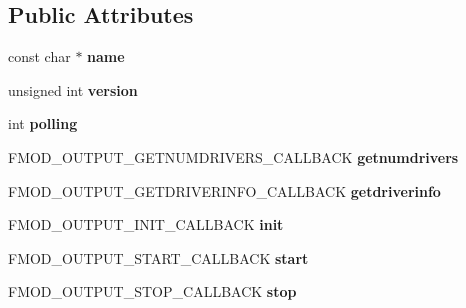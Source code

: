 \subsection*{Public Attributes}
\begin{DoxyCompactItemize}
\item 
\mbox{\label{structFMOD__OUTPUT__DESCRIPTION_a485fd85448a97e6762c535ec8b88f22a}} 
const char $\ast$ {\bfseries name}
\item 
\mbox{\label{structFMOD__OUTPUT__DESCRIPTION_a1ffa1ceb39e6b22a0887819f479cbdd9}} 
unsigned int {\bfseries version}
\item 
\mbox{\label{structFMOD__OUTPUT__DESCRIPTION_a523fa9268311d2f39464bc0d8bdacf53}} 
int {\bfseries polling}
\item 
\mbox{\label{structFMOD__OUTPUT__DESCRIPTION_a65a9a7d1b963ff0bf16fe0937bb50f69}} 
F\+M\+O\+D\+\_\+\+O\+U\+T\+P\+U\+T\+\_\+\+G\+E\+T\+N\+U\+M\+D\+R\+I\+V\+E\+R\+S\+\_\+\+C\+A\+L\+L\+B\+A\+CK {\bfseries getnumdrivers}
\item 
\mbox{\label{structFMOD__OUTPUT__DESCRIPTION_a83a93f62be3425e54992623c32a15417}} 
F\+M\+O\+D\+\_\+\+O\+U\+T\+P\+U\+T\+\_\+\+G\+E\+T\+D\+R\+I\+V\+E\+R\+I\+N\+F\+O\+\_\+\+C\+A\+L\+L\+B\+A\+CK {\bfseries getdriverinfo}
\item 
\mbox{\label{structFMOD__OUTPUT__DESCRIPTION_a985b9b14d82739abeee0eec8e0ae8a11}} 
F\+M\+O\+D\+\_\+\+O\+U\+T\+P\+U\+T\+\_\+\+I\+N\+I\+T\+\_\+\+C\+A\+L\+L\+B\+A\+CK {\bfseries init}
\item 
\mbox{\label{structFMOD__OUTPUT__DESCRIPTION_a3898df713781eba4e5dc7ca213cf5d52}} 
F\+M\+O\+D\+\_\+\+O\+U\+T\+P\+U\+T\+\_\+\+S\+T\+A\+R\+T\+\_\+\+C\+A\+L\+L\+B\+A\+CK {\bfseries start}
\item 
\mbox{\label{structFMOD__OUTPUT__DESCRIPTION_ae678f8389b77b6553491a53d04582fe3}} 
F\+M\+O\+D\+\_\+\+O\+U\+T\+P\+U\+T\+\_\+\+S\+T\+O\+P\+\_\+\+C\+A\+L\+L\+B\+A\+CK {\bfseries stop}
\item 

\end{DoxyCompactItemize}
